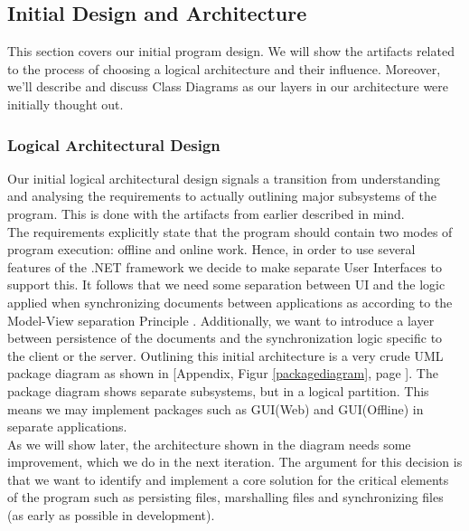 \subsection{Initial Design and Architecture}
This section covers our initial program design. We will show the artifacts related to the process of choosing a logical architecture and their influence. Moreover, we'll describe and discuss Class Diagrams as our layers in our architecture were initially thought out. 
\subsubsection{Logical Architectural Design}
Our initial logical architectural design signals a transition from understanding and analysing the requirements to actually outlining major subsystems of the program. This is done with the artifacts from earlier described in mind.\\
The requirements explicitly state that the program should contain two modes of program execution: offline and online work. Hence, in order to use several features of the .NET framework we decide to make separate User Interfaces to support this. It follows that we need some separation between UI and the logic applied when synchronizing documents between applications as according to the Model-View separation Principle \cite[p.~209]{OOAD}. Additionally, we want to introduce a layer between persistence of the documents and the synchronization logic specific to the client or the server. Outlining this initial architecture is a very crude UML package diagram as shown in [Appendix, Figur \ref{packagediagram}, page \pageref{packagediagram}].
The package diagram shows separate subsystems, but in a logical partition. This means we may implement packages such as GUI(Web) and GUI(Offline) in separate applications.\\
As we will show later, the architecture shown in the diagram needs some improvement, which we do in the next iteration. The argument for this decision is that we want to identify and implement a core solution for the critical elements of the program such as persisting files, marshalling files and synchronizing files (as early as possible in development).\\
